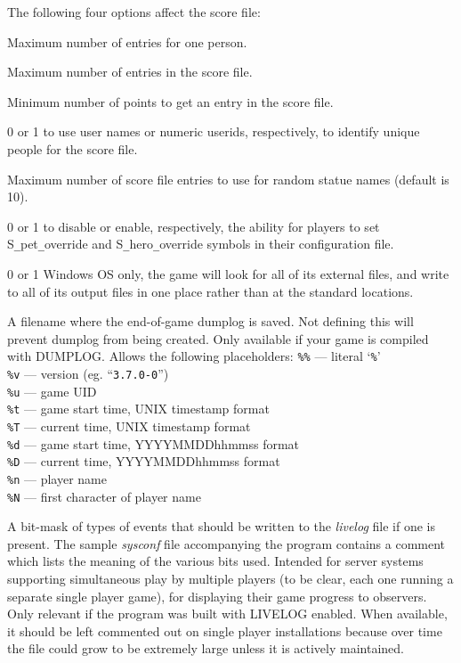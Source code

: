 The following four options affect the score file:
\blist {}
\item[\ib{PERSMAX}]
Maximum number of entries for one person.
\item[\ib{ENTRYMAX}]
Maximum number of entries in the score file.
\item[\ib{POINTSMIN}]
Minimum number of points to get an entry in the score file.
\item[\ib{PERS\verb+_+IS\verb+_+UID}]
0 or 1 to use user names or numeric userids, respectively, to identify
unique people for the score file.
\item[\ib{MAX\verb+_+STATUENAME\verb+_+RANK}]
Maximum number of score file entries to use for
random statue names (default is 10).
\item[\ib{ACCESSIBILITY}]
0 or 1 to disable or enable, respectively, the ability for players
to set S\verb+_+pet\verb+_+override and S\verb+_+hero\verb+_+override
symbols in their configuration file.
\item[\ib{PORTABLE\verb+_+DEVICE\verb+_+PATHS}]
0 or 1 Windows OS only, the game will look for all of its external
files, and write to all of its output files in one place
rather than at the standard locations.
\item[\ib{DUMPLOGFILE}]
A filename where the end-of-game dumplog is saved.
Not defining this will prevent dumplog from being created.
Only available if your game is compiled with DUMPLOG.
Allows the following placeholders:
{\tt \%\%}  --- literal `{\tt \%}'\\
{\tt \%v}  --- version (eg. ``{\tt 3.7.0-0}'')\\
{\tt \%u}  --- game UID\\
{\tt \%t}  --- game start time, UNIX timestamp format\\
{\tt \%T}  --- current time, UNIX timestamp format\\
{\tt \%d}  --- game start time, YYYYMMDDhhmmss format\\
{\tt \%D}  --- current time, YYYYMMDDhhmmss format\\
{\tt \%n}  --- player name\\
{\tt \%N}  --- first character of player name
\item[\ib{LIVELOG}]
A bit-mask of types of events that should be written to
the {\it livelog\/} file if one is present.
The sample {\it sysconf\/} file accompanying the program contains a
comment which lists the meaning of the various bits used.
Intended for server systems supporting simultaneous play by multiple
players (to be clear, each one running a separate single player game),
for displaying their game progress to observers.
Only relevant if the program was built with LIVELOG enabled.
When available, it should be left commented out on single player
installations because over time the file could grow to be extremely
large unless it is actively maintained.
\elist


